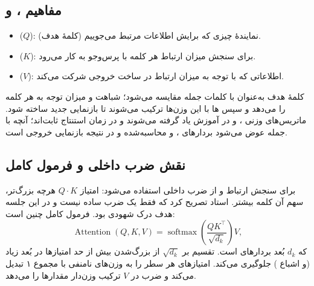 \subsection{مفاهیم ،  و }
\begin{itemize}
  \item {} ($Q$): نمایندهٔ چیزی که برایش اطلاعات مرتبط می‌جوییم (کلمهٔ هدف).
  \item {} ($K$): برای سنجش میزان ارتباط هر کلمه با پرس‌وجو به کار می‌رود.
  \item {} ($V$): اطلاعاتی که با توجه به میزان ارتباط در ساخت خروجی شرکت می‌کند.
\end{itemize}
کلمهٔ هدف به‌عنوان  با  کلمات جمله مقایسه می‌شود؛ شباهت  و  میزان توجه به هر کلمه را می‌دهد و سپس ها با این وزن‌ها ترکیب می‌شوند تا بازنمایی جدید ساخته شود. ماتریس‌های وزنی ،  و  در آموزش یاد گرفته می‌شوند و در زمان استنتاج ثابت‌اند؛ آنچه با جمله عوض می‌شود بردارهای ،  و  محاسبه‌شده و در نتیجه بازنمایی خروجی است.

\subsection{نقش ضرب داخلی و فرمول کامل}
برای سنجش ارتباط  و  از ضرب داخلی استفاده می‌شود: امتیاز $Q\cdot K$ هرچه بزرگ‌تر، سهم آن کلمه بیشتر. استاد تصریح کرد که  فقط یک ضرب ساده نیست و در این جلسه هدف درک شهودی بود. فرمول کامل  چنین است:
\[
\operatorname{Attention}(Q,K,V)=\operatorname{softmax}\!\left(\frac{QK^{\top}}{\sqrt{d_k}}\right)V ,
\]
که $d_k$ بُعد بردارهای  است. تقسیم بر $\sqrt{d_k}$ از بزرگ‌شدن بیش از حد امتیازها در بُعد زیاد (و اشباع ) جلوگیری می‌کند.  امتیازهای هر سطر را به وزن‌های نامنفی با مجموع ۱ تبدیل می‌کند و ضرب در $V$ ترکیب وزن‌دار مقدارها را می‌دهد.

